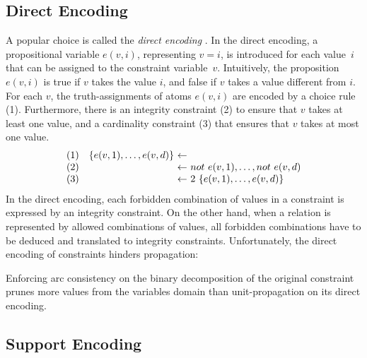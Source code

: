 \documentclass{tlp}
\newcommand{\dneg}{not\ }
\begin{document}
\subsection{Direct Encoding}

A popular choice is called the \emph{direct encoding} \cite{wa00}. In the direct encoding, a propositional variable $e(v, i)$, representing $v = i$, is introduced for each value~$i$ that can be assigned to the constraint variable~$v$. Intuitively, the proposition $e(v, i)$ is true if $v$ takes the value $i$, and false if $v$ takes a value different from $i$. For each $v$, the truth-assignments of atoms $e(v, i)$ are encoded by a choice rule (1). Furthermore, there is an integrity constraint (2) to ensure that $v$ takes at least one value, and a cardinality constraint (3) that ensures that $v$ takes at most one value.
\[
\begin{array}{lr@{\ \leftarrow\ }l}
(1) & \{ e(v, 1), \dots, e(v, d) \} & \\
(2) & & \dneg e(v, 1), \dots, \dneg e(v, d) \\
(3) & & 2\ \{ e(v, 1), \dots, e(v, d) \}
\end{array}
\]
In the direct encoding,
each forbidden combination of values in a constraint is expressed by an integrity constraint. On the other
hand, when a relation is represented by allowed combinations of values, all forbidden combinations have to be deduced and translated to integrity constraints. Unfortunately, the direct encoding of constraints hinders propagation:
\begin{theorem}[\citeNP{wa00}]
Enforcing arc consistency on the binary decomposition of the original constraint prunes more values from the variables domain than unit-propagation on its direct encoding.
\end{theorem}


\subsection{Support Encoding}
\end{document}
